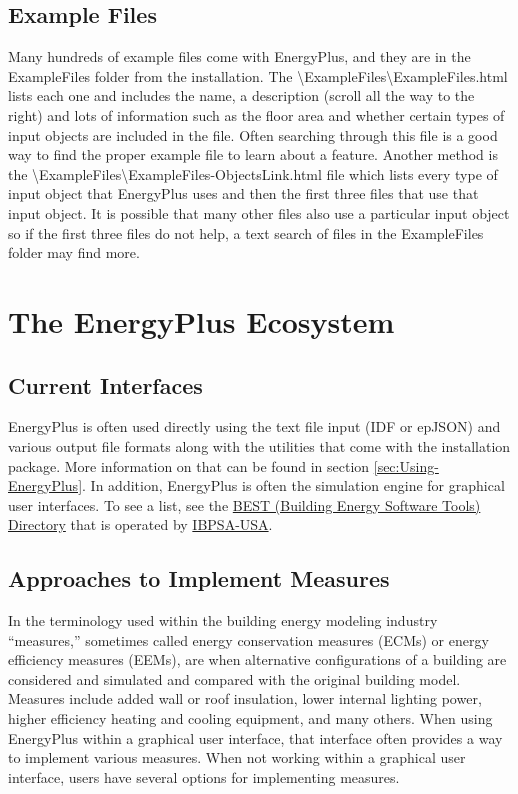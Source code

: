 \section{Example Files }

Many hundreds of example files come with EnergyPlus, and they are
in the ExampleFiles folder from the installation. The \textbackslash ExampleFiles\textbackslash ExampleFiles.html
lists each one and includes the name, a description (scroll all the
way to the right) and lots of information such as the floor area and
whether certain types of input objects are included in the file. Often
searching through this file is a good way to find the proper example
file to learn about a feature. Another method is the \textbackslash ExampleFiles\textbackslash ExampleFiles-ObjectsLink.html
file which lists every type of input object that EnergyPlus uses and
then the first three files that use that input object. It is possible
that many other files also use a particular input object so if the
first three files do not help, a text search of files in the ExampleFiles
folder may find more.

\chapter{The EnergyPlus Ecosystem }

\section{Current Interfaces }

EnergyPlus is often used directly using the text file input (IDF or
epJSON) and various output file formats along with the utilities that
come with the installation package. More information on that can be
found in section \ref{sec:Using-EnergyPlus}. In addition, EnergyPlus is often
the simulation engine for graphical user interfaces. To see a list,
see the \href{https://www.buildingenergysoftwaretools.com/}{BEST (Building Energy Software Tools) Directory}
that is operated by \href{https://www.ibpsa.us/}{IBPSA-USA}.

\section{Approaches to Implement Measures }

In the terminology used within the building energy modeling industry
``measures,'' sometimes called energy conservation measures (ECMs)
or energy efficiency measures (EEMs), are when alternative configurations
of a building are considered and simulated and compared with the original
building model. Measures include added wall or roof insulation, lower
internal lighting power, higher efficiency heating and cooling equipment,
and many others. When using EnergyPlus within a graphical user interface,
that interface often provides a way to implement various measures.
When not working within a graphical user interface, users have several
options for implementing measures.

